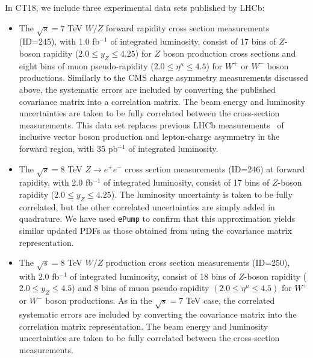 In CT18, we include three experimental data sets published by LHCb: 
\begin{itemize}
\item The $\sqrt{s}=7$ TeV $W/Z$ forward rapidity cross section measurements \cite{Aaij:2015gna} (ID=245), with 1.0 fb$^{-1}$ of integrated luminosity, consist of 17 bins of $Z$-boson
rapidity ($2.0 \leq y_Z \leq 4.25$) for $Z$ boson production cross sections and eight bins of muon pseudo-rapidity ($2.0 \leq \eta^\mu \leq 4.5$) for $W^+$ or $W^-$ boson productions.
Similarly to the CMS charge asymmetry measurements discussed above, the systematic errors
are included by converting the published covariance matrix into
a correlation matrix.
The beam energy and luminosity
uncertainties are taken to be fully correlated between the cross-section measurements. This data set replaces previous LHCb measurements~\cite{Aaij:2012vn} of
inclusive vector boson production and lepton-charge asymmetry in the forward region, with 35 pb$^{-1}$ of integrated luminosity.

\item The $\sqrt{s}=8$ TeV $Z\rightarrow e^+e^-$ cross section measurements \cite{Aaij:2015vua} (ID=246) at forward rapidity, with 2.0 fb$^{-1}$ of integrated luminosity, consist of 17
bins of $Z$-boson rapidity ($2.0 \leq y_Z \leq 4.25$). 
The luminosity uncertainty is taken to be fully correlated, but the other correlated uncertainties are simply added in quadrature. We have used \texttt{ePump} to confirm that this approximation yields similar updated PDFs as those obtained from using the covariance matrix representation.  


\item The $\sqrt{s}=8$ TeV $W/Z$ production cross section measurements \cite{Aaij:2015zlq} (ID=250), with 2.0 fb$^{-1}$ of integrated luminosity, consist of 18 bins of $Z$-boson rapidity
($2.0 \leq y_Z \leq 4.5$) and 8 bins of muon pseudo-rapidity $(2.0 \leq \eta^\mu \leq 4.5)$  for $W^+$ or $W^-$ boson productions. As in the $\sqrt{s}=7$ TeV case, the correlated systematic errors are included by converting the covariance matrix into the correlation matrix representation.
 The beam energy and luminosity uncertainties are taken to be fully correlated between the cross-section measurements.

\end{itemize}


